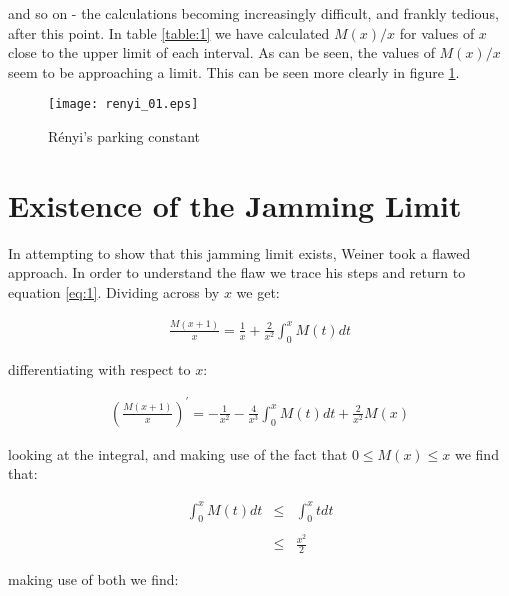 and so on - the calculations becoming increasingly difficult, and frankly tedious, after this point. In 
table \ref{table:1} we have calculated $M(x) / x$ for values of $x$ close to the upper limit of each interval. 
As can be seen, the values of $M(x) / x$ seem to be approaching a limit. This can be seen more clearly in 
figure \ref{fig:rpc1}. \bigskip

\begin{figure}[h!]
	\centering
	\texttt{[image: renyi\_01.eps]}
	\caption{R\'enyi's parking constant}
	\label{fig:rpc1}
\end{figure}\medskip











\section{Existence of the Jamming Limit}

In attempting to show that this jamming limit exists, Weiner took a flawed approach. In order to understand 
the flaw we trace his steps and return to equation \ref{eq:1}. Dividing across by $x$ we get: \bigskip

\begin{eqnarray} \label{eq:5}
	\frac{M(x + 1)}{x} = \frac{1}{x} + \frac{2}{x^2} \int_{0}^{x} M(t) dt
\end{eqnarray}\medskip

differentiating with respect to $x$: \bigskip

\begin{eqnarray*}
	\left(\frac{M(x + 1)}{x}\right)^{\prime} = -\frac{1}{x^2} - \frac{4}{x^3} \int_{0}^{x} M(t) dt + \frac{2}{x^2} M(x)
\end{eqnarray*}\medskip

looking at the integral, and making use of the fact that $0 \leq M(x) \leq x$ we find that: \bigskip

\begin{eqnarray*} 
	\int_{0}^{x} M(t) dt & \leq & \int_{0}^{x} t dt \\\\
						 & \leq & \frac{x^2}{2}
\end{eqnarray*}\medskip

making use of both we find: \bigskip


